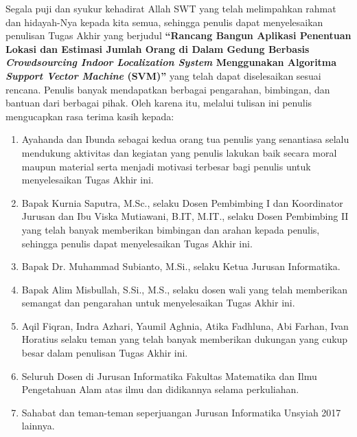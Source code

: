 \preface %


Segala puji dan syukur kehadirat Allah SWT yang telah melimpahkan rahmat dan hidayah-Nya kepada kita semua, sehingga penulis dapat menyelesaikan penulisan Tugas Akhir yang berjudul \textbf{“Rancang Bangun Aplikasi Penentuan Lokasi dan Estimasi Jumlah Orang di Dalam Gedung Berbasis \textit{Crowdsourcing Indoor Localization System} Menggunakan Algoritma \textit{Support Vector Machine} (SVM)”} yang telah dapat diselesaikan sesuai rencana. Penulis banyak mendapatkan berbagai pengarahan, bimbingan, dan bantuan dari berbagai pihak. Oleh karena itu, melalui tulisan ini penulis mengucapkan rasa terima kasih kepada:

\begin{enumerate}
	\item{Ayahanda dan Ibunda sebagai kedua orang tua penulis yang senantiasa selalu mendukung aktivitas dan kegiatan yang penulis lakukan baik secara moral maupun material serta menjadi motivasi terbesar bagi penulis untuk menyelesaikan Tugas Akhir ini.}
	\item{Bapak Kurnia Saputra, M.Sc., selaku Dosen Pembimbing I dan Koordinator Jurusan dan Ibu Viska Mutiawani, B.IT, M.IT., selaku Dosen Pembimbing II yang telah banyak memberikan bimbingan dan arahan kepada penulis, sehingga penulis dapat menyelesaikan Tugas Akhir ini.}
	\item {Bapak Dr. Muhammad Subianto, M.Si., selaku Ketua Jurusan Informatika.}
	      \item{Bapak Alim Misbullah, S.Si., M.S., selaku dosen wali yang telah memberikan semangat dan pengarahan untuk menyelesaikan Tugas Akhir ini.}
	\item Aqil Fiqran, Indra Azhari, Yaumil Aghnia, Atika Fadhluna, Abi Farhan, Ivan Horatius selaku teman yang telah banyak memberikan dukungan yang cukup besar dalam penulisan Tugas Akhir ini.
	      \item{Seluruh Dosen di Jurusan Informatika Fakultas Matematika dan Ilmu Pengetahuan Alam atas ilmu dan didikannya selama perkuliahan.}
	      \item{Sahabat dan teman-teman seperjuangan Jurusan Informatika Unsyiah 2017 lainnya.}
\end{enumerate}

